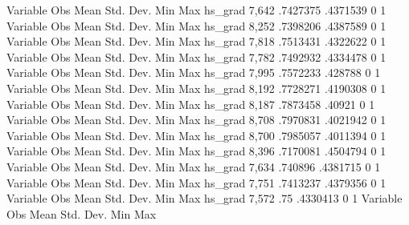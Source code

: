 {\smallskip}
    Variable {\VBAR}        Obs        Mean    Std. Dev.       Min        Max
     hs_grad {\VBAR}      7,642    .7427375    .4371539          0          1
{\smallskip}
    Variable {\VBAR}        Obs        Mean    Std. Dev.       Min        Max
     hs_grad {\VBAR}      8,252    .7398206    .4387589          0          1
{\smallskip}
    Variable {\VBAR}        Obs        Mean    Std. Dev.       Min        Max
     hs_grad {\VBAR}      7,818    .7513431    .4322622          0          1
{\smallskip}
    Variable {\VBAR}        Obs        Mean    Std. Dev.       Min        Max
     hs_grad {\VBAR}      7,782    .7492932    .4334478          0          1
{\smallskip}
    Variable {\VBAR}        Obs        Mean    Std. Dev.       Min        Max
     hs_grad {\VBAR}      7,995    .7572233     .428788          0          1
{\smallskip}
    Variable {\VBAR}        Obs        Mean    Std. Dev.       Min        Max
     hs_grad {\VBAR}      8,192    .7728271    .4190308          0          1
{\smallskip}
    Variable {\VBAR}        Obs        Mean    Std. Dev.       Min        Max
     hs_grad {\VBAR}      8,187    .7873458      .40921          0          1
{\smallskip}
    Variable {\VBAR}        Obs        Mean    Std. Dev.       Min        Max
     hs_grad {\VBAR}      8,708    .7970831    .4021942          0          1
{\smallskip}
    Variable {\VBAR}        Obs        Mean    Std. Dev.       Min        Max
     hs_grad {\VBAR}      8,700    .7985057    .4011394          0          1
{\smallskip}
    Variable {\VBAR}        Obs        Mean    Std. Dev.       Min        Max
     hs_grad {\VBAR}      8,396    .7170081    .4504794          0          1
{\smallskip}
    Variable {\VBAR}        Obs        Mean    Std. Dev.       Min        Max
     hs_grad {\VBAR}      7,634     .740896    .4381715          0          1
{\smallskip}
    Variable {\VBAR}        Obs        Mean    Std. Dev.       Min        Max
     hs_grad {\VBAR}      7,751    .7413237    .4379356          0          1
{\smallskip}
    Variable {\VBAR}        Obs        Mean    Std. Dev.       Min        Max
     hs_grad {\VBAR}      7,572         .75    .4330413          0          1
{\smallskip}
    Variable {\VBAR}        Obs        Mean    Std. Dev.       Min        Max
